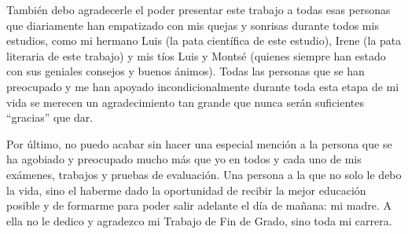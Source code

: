 También debo agradecerle el poder presentar este trabajo a todas esas personas que diariamente han empatizado con mis quejas y sonrisas durante todos mis estudios, como mi hermano Luis (la pata científica de este estudio), Irene (la pata literaria de este trabajo) y mis tíos Luis y Montsé (quienes siempre han estado con sus geniales consejos y buenos ánimos). Todas las personas que se han preocupado y me han apoyado incondicionalmente durante toda esta etapa de mi vida se merecen un agradecimiento tan grande que nunca serán suficientes ``gracias'' que dar.

Por último, no puedo acabar sin hacer una especial mención a la persona que se ha agobiado y preocupado mucho más que yo en todos y cada uno de mis exámenes, trabajos y pruebas de evaluación. Una persona a la que no solo le debo la vida, sino el haberme dado la oportunidad de recibir la mejor educación posible y de formarme para poder salir adelante el día de mañana: mi madre. A ella no le dedico y agradezco mi Trabajo de Fin de Grado, sino toda mi carrera.